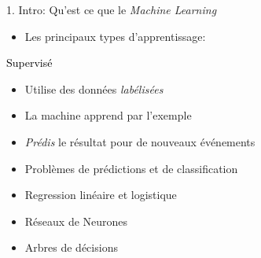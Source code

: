 \begin{frame}{1. Intro: Qu'est ce que le \textit{Machine Learning}}
  \begin{itemize}
  \item Les principaux types d'apprentissage:
  \end{itemize}
  \hspace{0.25\textwidth}
  \begin{beamerboxesrounded}[scheme=suppervise,width=0.5\textwidth]{\textcolor{black}{Supervisé}}
    \begin{itemize}
      \tiny
    \item Utilise des données \textit{labélisées}
    \item La machine apprend par l'exemple
    \item \textit{Prédis} le résultat pour de nouveaux événements
    \item Problèmes de prédictions et de classification
    \item Regression linéaire et logistique
    \item Réseaux de Neurones
    \item Arbres de décisions
    \end{itemize}
  \end{beamerboxesrounded}

  \vfill
  

\end{frame}
